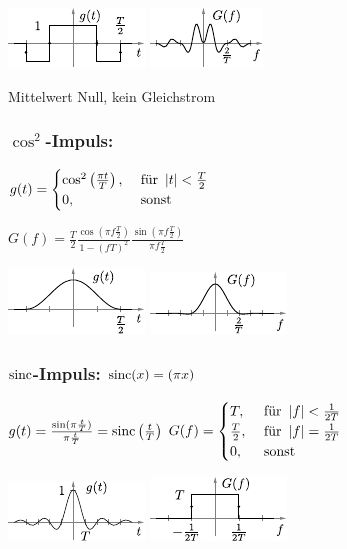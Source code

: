 \documentclass[fs, footer]{latex4ei}
\begin{document}
\begin{multicols*}{4}
{		\includegraphics{./img/FT/manchester_t.pdf} \hfill\includegraphics{./img/FT/manchester_f.pdf}

		Mittelwert Null, kein Gleichstrom
		\subsubsection{$\cos^2$-Impuls:} 
		$g(t) = \begin{cases}
			\cos^2\left(\frac{\pi t}{T}\right), &\text{ für } \abs{t} < \frac{T}{2}\\
			0, & \text{ sonst }
		\end{cases} $
		

		$G(f) = \frac{T}{2} \frac{\cos(\pi f \frac{T}{2})}{1 - (fT)^2} \frac{\sin (\pi f \frac T 2)}{\pi f \frac T 2}$

		\includegraphics{./img/FT/cos2_t.pdf} \hfill \includegraphics{./img/FT/cos2_f.pdf}

		\subsubsection{$\sinc$-Impuls: $\sinc(x) = \si(\pi x)$}
		$g(t) = \frac{\sin (\pi \frac t T)}{\pi \frac t  T} = \sinc\left(\frac{t}{T}\right)$ \hfill
		$G(f) = \begin{cases}
			T, &\text{ für } \abs{f} < \frac{1}{2T}\\
			\frac T 2 , &\text{ für } \abs{f} = \frac{1}{2T}\\
			0, &\text{ sonst } \\
		\end{cases}$

		\includegraphics{./img/FT/sinc_t.pdf} \hfill \includegraphics{./img/FT/sinc_f.pdf}
}
\end{multicols*}
\end{document}
